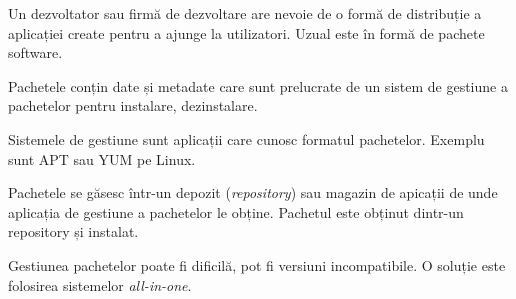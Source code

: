 Un dezvoltator sau firmă de dezvoltare are nevoie de o formă de distribuție a aplicației create pentru a ajunge la utilizatori.
Uzual este în formă de pachete software.

Pachetele conțin date și metadate care sunt prelucrate de un sistem de gestiune a pachetelor pentru instalare, dezinstalare.

Sistemele de gestiune sunt aplicații care cunosc formatul pachetelor.
Exemplu sunt APT sau YUM pe Linux.

Pachetele se găsesc într-un depozit (\textit{repository}) sau magazin de apicații de unde aplicația de gestiune a pachetelor le obține.
Pachetul este obținut dintr-un repository și instalat.

Gestiunea pachetelor poate fi dificilă, pot fi versiuni incompatibile.
O soluție este folosirea sistemelor \textit{all-in-one}.
